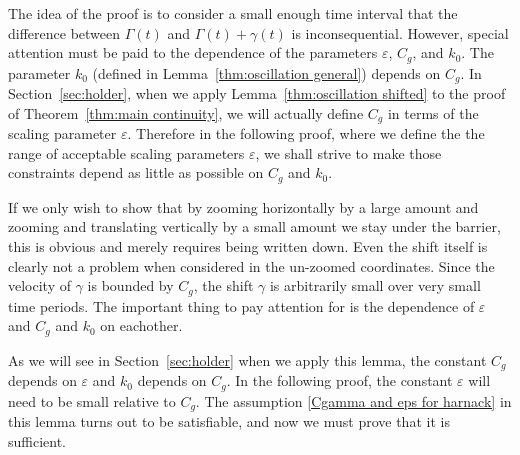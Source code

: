 \documentclass[11pt]{amsart}
\theoremstyle{remark}
\theoremstyle{definition}
\newcommand{\eps}{\varepsilon}
\newcommand{\Cgamma}{C_g}
\begin{document}
The idea of the proof is to consider a small enough time interval that the difference between $\Gamma(t)$ and $\Gamma(t) + \gamma(t)$ is inconsequential.  However, special attention must be paid to the dependence of the parameters $\eps$, $\Cgamma$, and $k_0$.  The parameter $k_0$ (defined in Lemma~\ref{thm:oscillation general}) depends on $\Cgamma$.  In Section~\ref{sec:holder}, when we apply Lemma~\ref{thm:oscillation shifted} to the proof of Theorem~\ref{thm:main continuity}, we will actually define $\Cgamma$ in terms of the scaling parameter $\eps$.  Therefore in the following proof, where we define the the range of acceptable scaling parameters $\eps$, we shall strive to make those constraints depend as little as possible on $\Cgamma$ and $k_0$.  

If we only wish to show that by zooming horizontally by a large amount and zooming and translating vertically by a small amount we stay under the barrier, this is obvious and merely requires being written down.  Even the shift itself is clearly not a problem when considered in the un-zoomed coordinates.  Since the velocity of $\gamma$ is bounded by $\Cgamma$, the shift $\gamma$ is arbitrarily small over very small time periods.  The important thing to pay attention for is the dependence of $\eps$ and $\Cgamma$ and $k_0$ on eachother.  

As we will see in Section~\ref{sec:holder} when we apply this lemma, the constant $\Cgamma$ depends on $\eps$ and $k_0$ depends on $\Cgamma$.  In the following proof, the constant $\eps$ will need to be small relative to $\Cgamma$.  The assumption \eqref{Cgamma and eps for harnack} in this lemma turns out to be satisfiable, and now we must prove that it is sufficient.  

\end{document}
